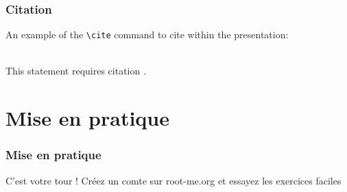 \documentclass{beamer}
\begin{document}

\begin{frame}[fragile] %
\frametitle{Citation}
An example of the \verb|\cite| command to cite within the presentation:\\~

This statement requires citation \cite{p1}.
\end{frame}


\section{Mise en pratique}
\begin{frame}
\frametitle{Mise en pratique}

    C'est votre tour ! Créez un comte sur root-me.org et essayez les exercices faciles

\end{frame}
\end{document}
